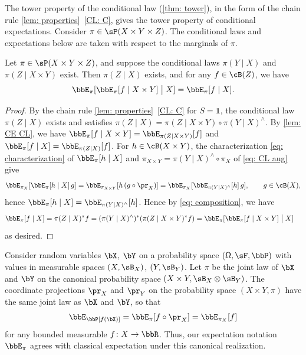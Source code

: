 \documentclass[12pt,reqno]{amsart}%
\theoremstyle{plain}
\theoremstyle{definition}
\def\R{\bbR}
\def\bsone{\boldsymbol{1}}
\begin{document}
The tower property of the conditional law (\cref{thm: tower}), in the form of the
chain rule \cref{lem: properties}~\ref{CL: C}, gives the tower property of conditional expectations.
Consider $\pi\in\sP(X\times Y\times Z)$.  The conditional laws and expectations below
are taken with respect to the marginals of $\pi$.

\begin{proposition}\label{prop: tower}
	Let $\pi\in\sP(X\times Y\times Z)$, and suppose the conditional laws
	$\pi(Y\mid X)$ and $\pi(Z\mid X\times Y)$ exist.
	Then $\pi(Z\mid X)$ exists, and for any $f\in\cB(Z)$, we have
	\[
		\bbE_\pi[\bbE_\pi[f\mid X\times Y]\bigm| X]=\bbE_\pi[f\mid X].
	\]
\end{proposition}

\begin{proof}
	By the chain rule \cref{lem: properties}~\ref{CL: C} for $S=\bsone$,
	the conditional law $\pi(Z\mid X)$ exists and satisfies
	$\pi(Z\mid X)=\pi(Z\mid X\times Y)\circ\pi(Y\mid X)^\wedge$.
	By \cref{lem: CE CL}, we have
	$\bbE_\pi[f\mid X\times Y]=\bbE_{\pi(Z\mid X\times Y)}[f]$ and $\bbE_\pi[f\mid X]=\bbE_{\pi(Z\mid X)}[f]$.
	For $h\in\cB(X\times Y)$, the characterization \eqref{eq: characterization} of $\bbE_\pi[h\mid X]$
	and $\pi_{X\times Y}=\pi(Y\mid X)^\wedge\circ\pi_X$ of \eqref{eq: CL aug} give
	\[
		\bbE_{\pi_X}[\bbE_\pi[h\mid X]\,g]=\bbE_{\pi_{X\times Y}}[h\,(g\circ\pr_X)]
		=\bbE_{\pi_X}[\bbE_{\pi(Y\mid X)^\wedge}[h]\,g],\qquad g\in\cB(X),
	\]
	hence $\bbE_\pi[h\mid X]=\bbE_{\pi(Y\mid X)^\wedge}[h]$.
	Hence by \eqref{eq: composition}, we have
	\begin{align*}
		\bbE_\pi[f\mid X]&=\pi(Z\mid X)^*f
		=(\pi(Y\mid X)^\wedge)^*(\pi(Z\mid X\times Y)^*f)
		=\bbE_\pi[\bbE_\pi[f\mid X\times Y]\bigm| X]
	\end{align*}
	as desired.
\end{proof}


Consider random variables $\bX$, $\bY$ on a probability space
$(\Omega,\sF,\bbP)$ with values in measurable spaces $(X,\sB_X)$, $(Y,\sB_Y)$.
Let $\pi$ be the joint law of $\bX$ and $\bY$ on the canonical probability space 
$(X\times Y,\sB_X\otimes\sB_Y)$.
The coordinate projections $\pr_X$ and $\pr_Y$ on the probability space $(X\times Y,\pi)$
have the same joint law as $\bX$ and $\bY$, so that
\[
	\bbE_\bbP[f(\bX)]=\bbE_\pi[f\circ\pr_X]=\bbE_{\pi_X}[f]
\]
for any bounded measurable $f\colon X\rightarrow\R$.
Thus, our expectation notation $\bbE_\pi$ agrees with classical expectation under this canonical
realization.  
\end{document}

